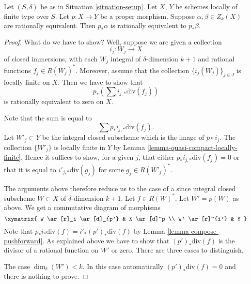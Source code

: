 \begin{lemma}
\label{lemma-proper-pushforward-rational-equivalence}
Let $(S, \delta)$ be as in Situation \ref{situation-setup}.
Let $X$, $Y$ be schemes locally of finite type over $S$.
Let $p : X \to Y$ be a proper morphism.
Suppose $\alpha, \beta \in Z_k(X)$ are rationally equivalent.
Then $p_*\alpha$ is rationally equivalent to $p_*\beta$.
\end{lemma}

\begin{proof}
What do we have to show? Well, suppose we are given a collection
$$
i_j : W_j \longrightarrow X
$$
of closed immersions, with each $W_j$ integral of $\delta$-dimension $k + 1$
and rational functions $f_j \in R(W_j)^*$.
Moreover, assume that
the collection $\{i_j(W_j)\}_{j \in J}$ is locally finite on $X$.
Then we have to show that
$$
p_*\left(\sum i_{j, *}\text{div}(f_j)\right)
$$
is rationally equivalent to zero on $X$.

\medskip\noindent
Note that the sum is equal to
$$
\sum p_*i_{j, *}\text{div}(f_j).
$$
Let $W'_j \subset Y$ be the integral closed subscheme which is the
image of $p \circ i_j$. The collection $\{W'_j\}$ is locally finite
in $Y$ by Lemma \ref{lemma-quasi-compact-locally-finite}.
Hence it suffices to show, for a given $j$, that either
$p_*i_{j, *}\text{div}(f_j) = 0$ or that it
is equal to $i'_{j, *}\text{div}(g_j)$ for some $g_j \in R(W'_j)^*$.

\medskip\noindent
The arguments above therefore reduce us to the case of a since
integral closed subscheme $W \subset X$ of $\delta$-dimension $k + 1$.
Let $f \in R(W)^*$. Let $W' = p(W)$ as above.
We get a commutative diagram of morphisms
$$
\xymatrix{
W \ar[r]_i \ar[d]_{p'} & X \ar[d]^p \\
W' \ar[r]^{i'} & Y
}
$$
Note that $p_*i_*\text{div}(f) = i'_*(p')_*\text{div}(f)$ by
Lemma \ref{lemma-compose-pushforward}. As explained above
we have to show that $(p')_*\text{div}(f)$
is the divisor of a rational function on $W'$ or zero.
There are three cases to distinguish.

\medskip\noindent
The case $\dim_\delta(W') < k$. In this case automatically
$(p')_*\text{div}(f) = 0$ and there is nothing to prove.


\end{proof}
